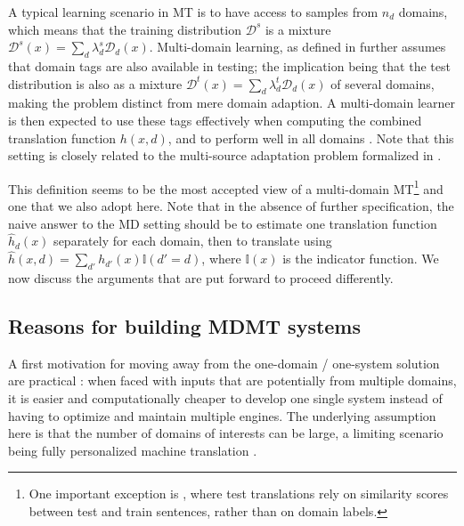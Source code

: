 \documentclass[11pt,a4paper]{article}
\newcommand{\fyTodo}[1]{\Todo[FY:]{\textcolor{orange}{#1}}}
\newcommand{\indic}[1]{\ensuremath{\mathbb{I}(#1)}}
\begin{document}
A typical learning scenario in MT is to have access to samples from $n_d$ domains, which means that the training distribution $\mathcal{D}^s$ is a mixture $\mathcal{D}^s(x) = \sum_d \lambda^{s}_{d} \mathcal{D}_d(x)$. Multi-domain learning, as defined in \cite{Dredze08online} further assumes that domain tags are also available in testing; the implication being that the test distribution is also as a mixture $\mathcal{D}^t(x) = \sum_d \lambda^{t}_{d} \mathcal{D}_d(x)$ of several domains, making the problem distinct from mere domain adaption.  A multi-domain learner is then expected to use these tags effectively \cite{Joshi12multidomain} when computing the combined translation function $h(x,d)$, and to perform well in all domains \cite{Finkel09hierarchical}. Note that this setting is closely related to the multi-source adaptation problem formalized in \cite{Mansour09domainadaptation,Mansour09multiple,Hoffman18algorithms}.

This definition seems to be the most accepted view of a multi-domain MT\footnote{One important exception is \cite{Farajian17multidomain}, where test translations rely on similarity scores between test and train sentences, rather than on domain labels.} and one that we also adopt here. Note that in the absence of further specification, the naive answer to the MD setting should be to estimate one translation function $\hat{h}_d(x)$ separately for each domain, then to translate using $\hat{h}(x,d) = \sum_{d'} h_{d'}(x) \indic{d' = d}$, where $\indic{x}$ is the indicator function. We now discuss the arguments that are put forward to proceed differently.


\subsection{Reasons for building MDMT systems \label{ssec:whymdmt}}

A first motivation for moving away from the one-domain / one-system solution are practical  \cite{Sennrich13multidomain,Farajian17neural}: when faced with inputs that are potentially from multiple domains, it is easier and computationally cheaper to develop one single system instead of having to optimize and maintain multiple engines. The underlying assumption here is that the number of domains of interests can be large, a limiting scenario being fully personalized machine translation \cite{Michel2018extreme}.
\end{document}
